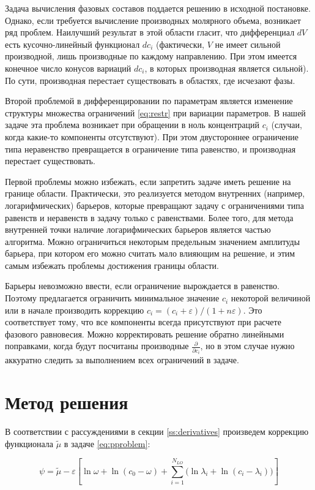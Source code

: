 \documentclass[12pt]{article}
\newcommand{\pd}[2]{\frac{\partial #1}{\partial #2}}
\renewcommand{\epsilon}{\varepsilon}
\begin{document}
Задача вычисления фазовых составов поддается решению в исходной постановке. Однако, если требуется вычисление производных молярного объема, возникает ряд проблем. Наилучший результат в этой области гласит, что дифференциал $dV$ есть кусочно-линейный функционал $dc_i$ (фактически, $V$ не имеет сильной производной, лишь производные по каждому направлению. При этом имеется конечное число конусов вариаций $dc_i$, в которых производная является сильной). По сути, производная перестает существовать в областях, где исчезают фазы.

Второй проблемой в дифференцировании по параметрам является изменение структуры множества ограничений \eqref{eq:restr} при вариации параметров. В нашей задаче эта проблема возникает при обращении в ноль концентраций $c_i$ (случаи, когда какие-то компоненты отсутствуют). При этом двустороннее ограничение типа неравенство превращается в ограничение типа равенство, и производная перестает существовать.

Первой проблемы можно избежать, если запретить задаче иметь решение на границе области. Практически, это реализуется методом внутренних (например, логарифмических) барьеров, которые превращают задачу с ограничениями типа равенств и неравенств в задачу только с равенствами. Более того, для метода внутренней точки наличие логарифмических барьеров является частью алгоритма. Можно ограничиться некоторым предельным значением амплитуды барьера, при котором его можно считать мало влияющим на решение, и этим самым избежать проблемы достижения границы области.

Барьеры невозможно ввести, если ограничение вырождается в равенство. Поэтому предлагается ограничить минимальное значение $c_i$ некоторой величиной или в начале производить коррекцию $c_i = (c_i + \epsilon)/(1 + n\epsilon)$. Это соответствует тому, что все компоненты всегда присутствуют при расчете фазового равновесия. Можно корректировать решение обратно линейными поправками, когда будут посчитаны производные $\pd{}{c_i}$, но в этом случае нужно аккуратно следить за выполнением всех ограничений в задаче.

\section{Метод решения}

В соответствии с рассуждениями в секции \ref{ss:derivatives} произведем коррекцию функционала $\tilde \mu$ в задаче \eqref{eq:pproblem}:

\begin{equation}
\psi = \tilde\mu - \varepsilon \left[
\ln \omega + \ln (c_0 - \omega) + 
\sum_{i=1}^{N_{LO}} \Big( \ln \lambda_i
+ \ln (c_i - \lambda_i) \Big) 
\right]
\end{equation}
\end{document}
